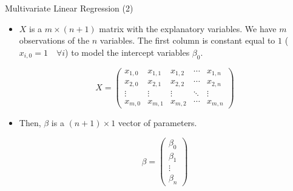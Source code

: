 \documentclass[handout]{beamer}
\begin{document}
\begin{frame}{Multivariate Linear Regression (2)}
\scriptsize{
\begin{itemize} 
\item $X$ is a $m \times (n+1)$  matrix with the explanatory variables. We have $m$ observations of the $n$ variables.  The first column is constant equal to $1$ ($x_{i,0}=1 \quad \forall i$) to model the intercept variables $\beta_0$.

\begin{displaymath}
 X =
 \begin{pmatrix}
x_{1,0} &  x_{1,1} & x_{1,2} & \cdots & x_{1,n} \\
x_{2,0} &  x_{2,1} & x_{2,2} & \cdots & x_{2,n} \\
\vdots  &  \vdots  & \vdots  & \ddots & \vdots  \\
x_{m,0} &  x_{m,1} & x_{m,2} & \cdots & x_{m,n}
 \end{pmatrix}
\end{displaymath}

 \item Then, $\beta$ is a $(n+1) \times 1$ vector of parameters.

\begin{displaymath}
 \beta =
 \begin{pmatrix}
  \beta_{0}  \\
  \beta_{1}  \\
  \vdots    \\
  \beta_{n} 
 \end{pmatrix}
\end{displaymath}





\end{itemize}
 

}
\end{frame}
\end{document}
